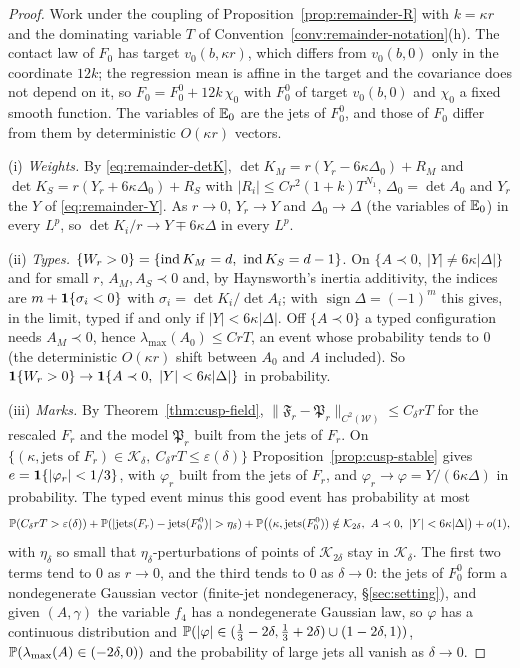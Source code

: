 \begin{proof}
Work under the coupling of Proposition~\ref{prop:remainder-R} with $k=\kappa r$ and the dominating variable $T$ of Convention~\ref{conv:remainder-notation}(h). The contact law of $F_0$ has target $v_0(b,\kappa r)$, which differs from $v_0(b,0)$ only in the coordinate $12k$; the regression mean is affine in the target and the covariance does not depend on it, so $F_0=F_0^0+12k\,\chi_0$ with $F_0^0$ of target $v_0(b,0)$ and $\chi_0$ a fixed smooth function. The variables of $\mathbb E_0$ are the jets of $F_0^0$, and those of $F_0$ differ from them by deterministic $O(\kappa r)$ vectors.

(i) \emph{Weights.} By \eqref{eq:remainder-detK}, $\det K_M=r(Y_r-6\kappa\Delta_0)+R_M$ and $\det K_S=r(Y_r+6\kappa\Delta_0)+R_S$ with $|R_i|\le Cr^2(1+k)T^{N_1}$, $\Delta_0=\det A_0$ and $Y_r$ the $Y$ of \eqref{eq:remainder-Y}. As $r\to0$, $Y_r\to Y$ and $\Delta_0\to\Delta$ (the variables of $\mathbb E_0$) in every $L^p$, so $\det K_i/r\to Y\mp6\kappa\Delta$ in every $L^p$.

(ii) \emph{Types.} $\{W_r>0\}=\{\operatorname{ind} K_M=d,\ \operatorname{ind} K_S=d-1\}$. On $\{A\prec0,\ |Y|\ne6\kappa|\Delta|\}$ and for small $r$, $A_M,A_S\prec0$ and, by Haynsworth's inertia additivity, the indices are $m+\mathbf 1\{\sigma_i<0\}$ with $\sigma_i=\det K_i/\det A_i$; with $\operatorname{sign}\Delta=(-1)^m$ this gives, in the limit, typed if and only if $|Y|<6\kappa|\Delta|$. Off $\{A\prec0\}$ a typed configuration needs $A_M\prec0$, hence $\lambda_{\max}(A_0)\le CrT$, an event whose probability tends to $0$ (the deterministic $O(\kappa r)$ shift between $A_0$ and $A$ included). So $\ind\{W_r>0\}\to\ind\{A\prec0,\ |Y|<6\kappa|\Delta|\}$ in probability.

(iii) \emph{Marks.} By Theorem~\ref{thm:cusp-field}, $\|\mathfrak F_r-\mathfrak P_r\|_{C^2(\mathcal W)}\le C_\delta rT$ for the rescaled $F_r$ and the model $\mathfrak P_r$ built from the jets of $F_r$. On $\{(\kappa,\text{jets of }F_r)\in\mathcal K_\delta,\ C_\delta rT\le\varepsilon(\delta)\}$ Proposition~\ref{prop:cusp-stable} gives $e=\mathbf 1\{|\varphi_r|<1/3\}$, with $\varphi_r$ built from the jets of $F_r$, and $\varphi_r\to\varphi=Y/(6\kappa\Delta)$ in probability. The typed event minus this good event has probability at most
\[
\Prob(C_\delta rT>\varepsilon(\delta))+\Prob(|\mathrm{jets}(F_r)-\mathrm{jets}(F_0^0)|>\eta_\delta)+\Prob\bigl((\kappa,\mathrm{jets}(F_0^0))\notin\mathcal K_{2\delta},\ A\prec0,\ |Y|<6\kappa|\Delta|\bigr)+o(1),
\]
with $\eta_\delta$ so small that $\eta_\delta$-perturbations of points of $\mathcal K_{2\delta}$ stay in $\mathcal K_\delta$. The first two terms tend to $0$ as $r\to0$, and the third tends to $0$ as $\delta\to0$: the jets of $F_0^0$ form a nondegenerate Gaussian vector (finite-jet nondegeneracy, \S\ref{sec:setting}), and given $(A,\gamma)$ the variable $f_4$ has a nondegenerate Gaussian law, so $\varphi$ has a continuous distribution and $\mathbb P(|\varphi|\in(\frac13-2\delta,\frac13+2\delta)\cup(1-2\delta,1))$, $\mathbb P(\lambda_{\max}(A)\in(-2\delta,0))$ and the probability of large jets all vanish as $\delta\to0$.


\end{proof}
